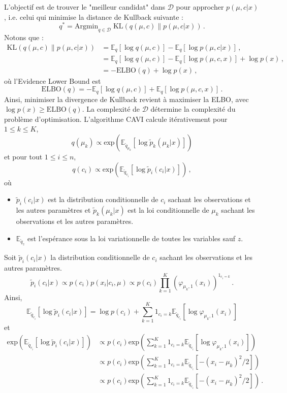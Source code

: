 \documentclass[a4paper,10pt,fleqn]{article}
\newcommand{\1}{\ensuremath{\mathbbm{1}}}
\begin{document}
L'objectif est de trouver le
"meilleur candidat" dans $\mathcal{D}$ pour approcher $p(\mu,c|x)$, i.e. celui qui minimise la distance de Kullback suivante :
$$
q^* = \mathrm{Argmin}_{q\in\mathcal{D}}\; \mathrm{KL}\left(q(\mu,c)\|p(\mu,c|x)\right)\,.
$$
Notons que :
\begin{align*}
\mathrm{KL}\left(q(\mu,c)\|p(\mu,c|x)\right) &= \mathbb{E}_q[\log q(\mu,c)] - \mathbb{E}_q[\log p(\mu,c|x)]\,,\\
 &= \mathbb{E}_q[\log q(\mu,c)] - \mathbb{E}_q[\log p(\mu,c,x)]+\log p(x)\,,\\
&= -\mathrm{ELBO}(q)+\log p(x)\,,
\end{align*}
o\`u l'Evidence Lower Bound est
$$
\mathrm{ELBO}(q) = -\mathbb{E}_q[\log q(\mu,c)] + \mathbb{E}_q[\log p(\mu,c,x)] \,.
$$
Ainsi, minimiser la divergence de Kullback revient \`a maximiser la ELBO, avec $\log p(x)\geqslant \mathrm{ELBO}(q)$. La complexit\'e de $\mathcal{D}$ d\'etermine la complexit\'e du probl\`eme d'optimisation. L'algorithme CAVI calcule it\'erativement pour $1\leqslant k \leqslant K$,
$$
q(\mu_k) \propto \mathrm{exp}\left(\mathbb{E}_{\tilde q_{\mu_k}}[\log \tilde p_k(\mu_k|x)]\right)
$$
et pour tout  $1\leqslant i \leqslant n$,
$$
q(c_i) \propto \mathrm{exp}\left(\mathbb{E}_{\tilde q_{c_i}}[\log \tilde p_i(c_i|x)]\right)\,,
$$
o\`u
\begin{itemize}
\item $\tilde p_i(c_i|x)$ est la distribution conditionnelle de $c_i$ sachant les observations et les autres param\`etres et $\tilde p_k(\mu_k|x)$ est la loi conditionnelle de $\mu_k$ sachant les observations et les autres param\`etres.
\item $\mathbb{E}_{\tilde q_z}$ est l'esp\'erance sous la loi variationnelle de toutes les variables sauf $z$.
\end{itemize}
Soit $\tilde p_i(c_i|x)$ la distribution conditionnelle de $c_i$ sachant les observations et les autres param\`etres.
$$
\tilde p_i(c_i|x) \propto p(c_i)p(x_i|c_i,\mu) \propto p(c_i)\prod_{k=1}^K \left(\varphi_{\mu_k,1}(x_i)\right)^{1_{c_i=k}}\,. 
$$
Ainsi,
$$
\mathbb{E}_{\tilde q_{c_i}}[\log \tilde p_i(c_i|x)] = \log p(c_i) + \sum_{k=1}^K 1_{c_i=k} \mathbb{E}_{\tilde q_{c_i}}[\log \varphi_{\mu_k,1}(x_i)]
$$
et
\begin{align*}
\mathrm{exp}\left(\mathbb{E}_{\tilde q_{c_i}}[\log \tilde p_i(c_i|x)]\right) &\propto p(c_i) \mathrm{exp}\left(\sum_{k=1}^K 1_{c_i=k} \mathbb{E}_{\tilde q_{c_i}}[\log \varphi_{\mu_k,1}(x_i)]\right)\,\\
&\propto p(c_i) \mathrm{exp}\left(\sum_{k=1}^K 1_{c_i=k} \mathbb{E}_{\tilde q_{c_i}}[-(x_i-\mu_k)^2/2]\right)\,\\
&\propto p(c_i) \mathrm{exp}\left(\sum_{k=1}^K 1_{c_i=k} \mathbb{E}_{\tilde q_{c_i}}[-(x_i-\mu_k)^2/2]\right)\,.
\end{align*}
\end{document}
